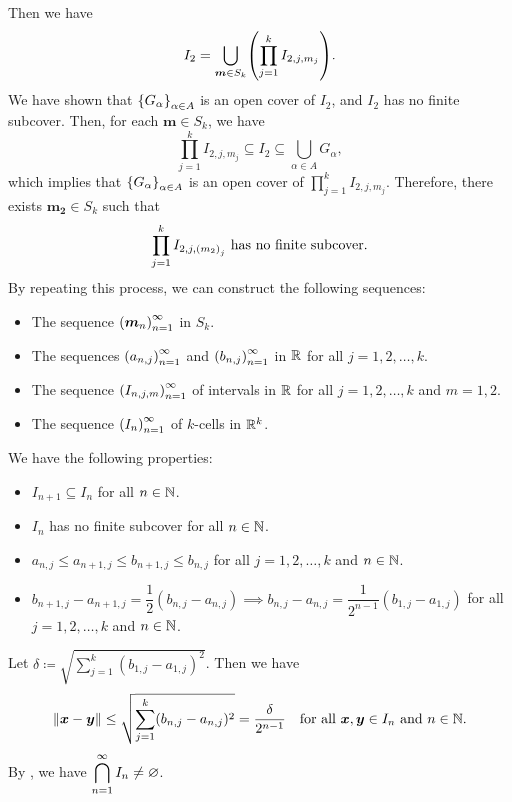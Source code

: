    Then we have
    \[
    I_{2} = \bigcup_{\bm{m} \in S_{k}} \paren*{\prod_{j = 1}^{k} I_{2, j, m_{j}}}.
    \]
    We have shown that $\set*{G_{\alpha}}_{\alpha \in A}$ is an open cover of $I_{2}$, and $I_{2}$ has no finite subcover.
    Then, for each $\bm{m} \in S_{k}$, we have
    \[
    \prod_{j = 1}^{k} I_{2, j, m_{j}} \subseteq I_{2} \subseteq \bigcup_{\alpha \in A} G_{\alpha},
    \]
    which implies that $\set*{G_{\alpha}}_{\alpha \in A}$ is an open cover of
    $\displaystyle \prod_{j = 1}^{k} I_{2, j, m_{j}}$. Therefore, there exists $\bm{m_{2}} \in S_{k}$ such that
    \[
    \prod_{j = 1}^{k} I_{2, j, \paren*{m_{2}}_{j}} \text{ has no finite subcover}.
    \]
    By repeating this process, we can construct the following sequences:
    \begin{itemize}
        \item The sequence $\paren*{\bm{m}_{n}}_{n = 1}^{\infty}$ in $S_{k}$.
        \item The sequences $\paren*{a_{n, j}}_{n = 1}^{\infty}$ and
        $\paren*{b_{n, j}}_{n = 1}^{\infty}$ in $\R$ for all $j = 1, 2, \dots, k$.
        \item The sequence $\paren*{I_{n, j, m}}_{n = 1}^{\infty}$ of intervals in $\R$
        for all $j = 1, 2, \dots, k$ and $m = 1, 2$.
        \item The sequence $\paren*{I_{n}}_{n = 1}^{\infty}$ of $k$-cells in $\R^{k}$.
    \end{itemize}
    We have the following properties:
    \begin{itemize}
        \item $I_{n + 1} \subseteq I_{n}$ for all $n \in \N$.
        \item $I_{n}$ has no finite subcover for all $n \in \N$.
        \item $a_{n, j} \leq a_{n + 1, j} \leq b_{n + 1, j} \leq b_{n, j}$ for all $j = 1, 2, \dots, k$ and $n \in \N$.
        \item $b_{n + 1, j} - a_{n + 1, j} = \dfrac{1}{2}(b_{n, j} - a_{n, j}) \implies b_{n, j} - a_{n, j} =
        \dfrac{1}{2^{n - 1}}(b_{1, j} - a_{1, j})$ for all $j = 1, 2, \dots, k$ and $n \in \N$.
    \end{itemize}
    Let $\delta \coloneqq \displaystyle \sqrt{\sum_{j = 1}^{k} (b_{1, j} - a_{1, j})^{2}}$. Then we have
    \[
    \norm*{\bm{x} - \bm{y}} \leq \sqrt{\sum_{j = 1}^{k} (b_{n, j} - a_{n, j})^{2}} =
    \frac{\delta}{2^{n - 1}} \quad \text{for all } \bm{x}, \bm{y} \in I_{n} \text{ and } n \in \N.
    \]
    By , we have $\displaystyle \bigcap_{n = 1}^{\infty} I_{n} \neq \vnot$.
